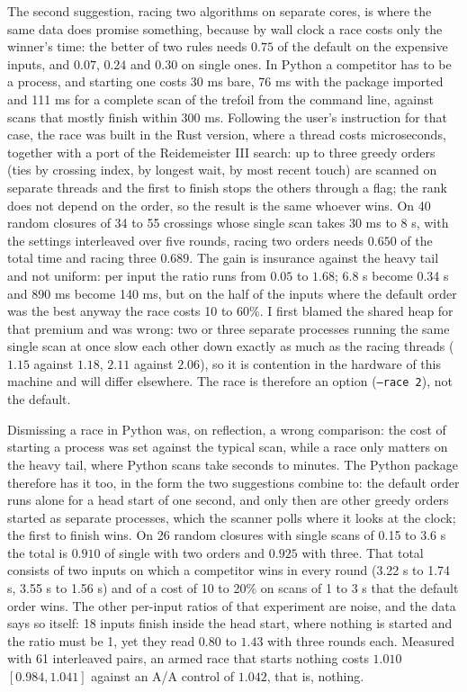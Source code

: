 The second suggestion, racing two algorithms on separate cores, is where the
same data does promise something, because by wall clock a race costs only the
winner's time: the better of two rules needs $0.75$ of the default on the
expensive inputs, and $0.07$, $0.24$ and $0.30$ on single ones. In Python a
competitor has to be a process, and starting one costs 30 ms bare, 76 ms with
the package imported and 111 ms for a complete scan of the trefoil from the
command line, against scans that mostly finish within 300 ms. Following the
user's instruction for that case, the race was built in the Rust version, where
a thread costs microseconds, together with a port of the Reidemeister III
search: up to three greedy orders (ties by crossing index, by longest wait, by
most recent touch) are scanned on separate threads and the first to finish
stops the others through a flag; the rank does not depend on the order, so the
result is the same whoever wins. On 40 random closures of 34 to 55 crossings
whose single scan takes 30 ms to 8 s, with the settings interleaved over five
rounds, racing two orders needs $0.650$ of the total time and racing three
$0.689$. The gain is insurance against the heavy tail and not uniform: per
input the ratio runs from $0.05$ to $1.68$; 6.8 s become 0.34 s and 890 ms
become 140 ms, but on the half of the inputs where the default order was the
best anyway the race costs 10 to 60\%. I first blamed the shared heap for that
premium and was wrong: two or three separate processes running the same single
scan at once slow each other down exactly as much as the racing threads
($1.15$ against $1.18$, $2.11$ against $2.06$), so it is contention in the
hardware of this machine and will differ elsewhere. The race is therefore an
option (\texttt{--race 2}), not the default.

Dismissing a race in Python was, on reflection, a wrong comparison: the cost of
starting a process was set against the typical scan, while a race only matters
on the heavy tail, where Python scans take seconds to minutes. The Python
package therefore has it too, in the form the two suggestions combine to: the
default order runs alone for a head start of one second, and only then are
other greedy orders started as separate processes, which the scanner polls
where it looks at the clock; the first to finish wins. On 26 random closures
with single scans of 0.15 to 3.6 s the total is $0.910$ of single with two
orders and $0.925$ with three. That total consists of two inputs on which a
competitor wins in every round (3.22 s to 1.74 s, 3.55 s to 1.56 s) and of a
cost of 10 to 20\% on scans of 1 to 3 s that the default order wins. The other
per-input ratios of that experiment are noise, and the data says so itself: 18
inputs finish inside the head start, where nothing is started and the ratio
must be 1, yet they read $0.80$ to $1.43$ with three rounds each. Measured with
61 interleaved pairs, an armed race that starts nothing costs $1.010$
$[0.984, 1.041]$ against an A/A control of $1.042$, that is, nothing.

